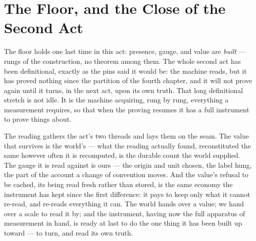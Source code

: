 \section{The Floor, and the Close of the Second Act}

The floor holds one last time in this act: presence, gauge, and value are \emph{built} --- rungs of the
construction, no theorem among them. The whole second act has been definitional, exactly as the pins said it
would be: the machine reads, but it has proved nothing since the partition of the fourth chapter, and it will not
prove again until it turns, in the next act, upon its own truth. That long definitional stretch is not idle. It
is the machine acquiring, rung by rung, everything a measurement requires, so that when the proving resumes it
has a full instrument to prove things about.

The reading gathers the act's two threads and lays them on the seam. The value that survives is the world's ---
what the reading actually found, reconstituted the same however often it is recomputed, is the durable count the
world supplied. The gauge it is read against is ours --- the origin and unit chosen, the label hung, the part of
the account a change of convention moves. And the value's refusal to be cached, its being read fresh rather than
stored, is the same economy the instrument has kept since the first difference: it pays to keep only what it
cannot re-read, and re-reads everything it can. The world hands over a value; we hand over a scale to read it by;
and the instrument, having now the full apparatus of measurement in hand, is ready at last to do the one thing it
has been built up toward --- to turn, and read its own truth.
